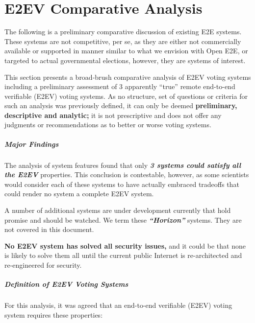 \newcommand{\capimg}[2][]{\texttt{[image: comparative\_analysis\_resources/capstone\_images/\#2]}}
\chapter{E2EV Comparative Analysis}

The following is a preliminary comparative discussion of existing E2E systems. These systems are not competitive, per se, as they are either not commercially available or supported in manner similar to what we envision with Open E2E, or targeted to actual governmental elections, however, they are systems of interest.

This section presents a broad-brush comparative analysis of E2EV voting systems including a preliminary assessment of 3 apparently ``true'' remote end-to-end verifiable (E2EV) voting systems. As no structure, set of questions or criteria for such an analysis was previously defined, it can only be deemed \textbf{preliminary, descriptive and analytic; }it is not prescriptive and does not offer any judgments or recommendations as to better or worse voting systems.

\paragraph*{Major Findings}

The analysis of system features found that only \textbf{\textit{3 systems could satisfy all the E2EV }}properties. This conclusion is contestable, however, as some scientists would consider each of these systems to have actually embraced tradeoffs that could render no system a complete E2EV system.

A number of additional systems are under development currently that hold promise and should be watched. We term these \textbf{\textit{``Horizon'' }}systems. They are not covered in this document.

\textbf{No E2EV system has solved all security issues, }and it could be that none is likely to solve them all until the current public Internet is re-architected and re-engineered for security.

\paragraph*{Definition of E2EV Voting Systems}

For this analysis, it was agreed that an end-to-end verifiable (E2EV) voting system requires these properties:

